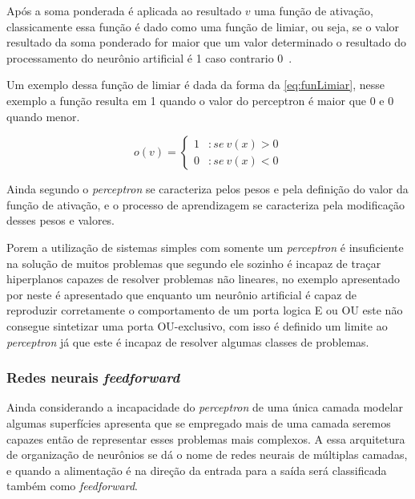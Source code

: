 \documentclass[
    12pt,
    oneside,
    a4paper,
    english,
    brazil
]{abntex2}
\begin{document}
Após  a soma  ponderada é  aplicada ao  resultado $v$  uma função  de ativação,
classicamente essa função é dado como uma função de limiar, ou seja, se o valor
resultado da soma  ponderado for maior que um valor  determinado o resultado do
processamento do neurônio artificial é 1 caso contrario 0~\cite{knight}.

Um exemplo  dessa função de limiar  é dada da forma  da \autoref{eq:funLimiar},
nesse exemplo a função resulta em 1 quando  o valor do perceptron é maior que 0
e 0 quando menor.

\begin{equation}
    \label{eq:funLimiar}
    o(v) = \left\{
        \begin{array}{lr}
            1 & :se\  v(x) > 0\\
            0 & :se\  v(x) < 0
        \end{array}
    \right.
\end{equation}

Ainda segundo   o  \textit{perceptron} se  caracteriza pelos
pesos  e pela  definição  do valor  da  função  de ativação,  e  o processo  de
aprendizagem se caracteriza pela modificação desses pesos e valores.

Porem a  utilização de  sistemas simples com  somente um  \textit{perceptron} é
insuficiente na solução de muitos problemas que segundo  ele
sozinho  é incapaz  de traçar  hiperplanos  capazes de  resolver problemas  não
lineares, no  exemplo apresentado  por  neste  é apresentado
que  enquanto um  neurônio  artificial  é capaz  de  reproduzir corretamente  o
comportamento de um porta logica E ou OU este não consegue sintetizar uma porta
OU-exclusivo, com isso é definido um limite ao \textit{perceptron} já que este
é incapaz de resolver algumas classes de problemas.

\subsubsection{Redes neurais \textit{feedforward}}

Ainda considerando  a incapacidade do  \textit{perceptron} de uma  única camada
modelar algumas superfícies  apresenta que se empregado mais
de  uma  camada seremos  capazes  então  de  representar esses  problemas  mais
complexos. A essa arquitetura de organização de neurônios se dá o nome de redes
neurais de  múltiplas camadas, e quando  a alimentação é na  direção da entrada
para a saída será classificada também como \textit{feedforward}.
\end{document}
